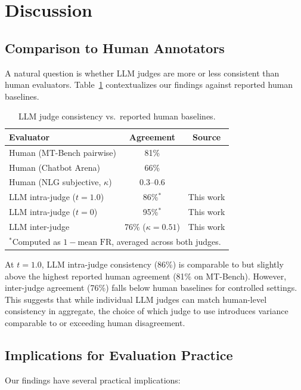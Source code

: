 \documentclass{ijclclp}
\begin{document}
\section{Discussion}

\subsection{Comparison to Human Annotators}

A natural question is whether LLM judges are more or less consistent than human evaluators. Table~\ref{tab:human} contextualizes our findings against reported human baselines.

\begin{table}[h]
\centering
\caption{LLM judge consistency vs.\ reported human baselines.}
\label{tab:human}
\begin{tabular}{lcc}
\toprule
\textbf{Evaluator} & \textbf{Agreement} & \textbf{Source} \\
\midrule
Human (MT-Bench pairwise) & 81\% & \citet{zheng2023judging} \\
Human (Chatbot Arena) & 66\% & \citet{chiang2024chatbot} \\
Human (NLG subjective, $\kappa$) & 0.3--0.6 & \citet{amidei2019agreement} \\
\midrule
LLM intra-judge ($t=1.0$) & 86\%$^*$ & This work \\
LLM intra-judge ($t=0$) & 95\%$^*$ & This work \\
LLM inter-judge & 76\% ($\kappa=0.51$) & This work \\
\bottomrule
\multicolumn{3}{l}{\small $^*$Computed as $1 - \text{mean FR}$, averaged across both judges.}
\end{tabular}
\end{table}

At $t=1.0$, LLM intra-judge consistency (86\%) is comparable to but slightly above the highest reported human agreement (81\% on MT-Bench). However, inter-judge agreement (76\%) falls below human baselines for controlled settings. This suggests that while individual LLM judges can match human-level consistency in aggregate, the choice of which judge to use introduces variance comparable to or exceeding human disagreement.

\subsection{Implications for Evaluation Practice}

Our findings have several practical implications:
\end{document}
